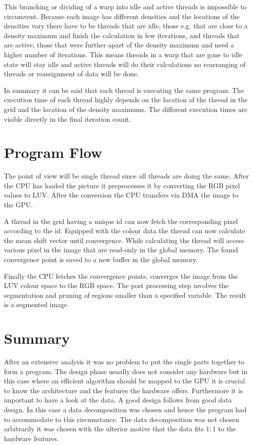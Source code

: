 This branching or dividing of a warp into idle and active threads is impossible
to circumvent. Because each image has different densities and the locations
of the densities vary there have to be threads that are idle, those e.g. that
are close to a density maximum and finish the calculation in few iterations,
and threads that are active, those that were further apart of the density maximum
and need a higher number of iterations. This means threads in a warp that
are gone to idle state will stay idle and active threads will do their 
calculations no rearranging of threads or reassignment of data will be done. 

In summary it can be said that each thread is executing the same program. The 
execution time of each thread highly depends on the location of the thread in
the grid and the location of the density maximums. The different execution times
are visible directly in the final iteration count. 

\section{Program Flow} %
\label{sec:program_flow}

The point of view will be single thread since all threads are doing the same. 
After the \gls{CPU} has loaded the picture it preprocesses it by converting
the \gls{RGB} pixel values to \gls{LUV}. After the conversion the \gls{CPU}
transfers via \gls{DMA} the image to the \gls{GPU}.

A thread in the grid having a unique id can now fetch the corresponding pixel
according to the id. Equipped with the colour data the thread can now calculate
the mean shift vector until convergence. While calculating the thread will 
access various pixel in the image that are read-only in the global memory. The 
found convergence point is saved to a new buffer in the global memory.

Finally the \gls{CPU} fetches the convergence points, converges the image from 
the \gls{LUV} colour space to the \gls{RGB} space. The post processing step
involves the segmentation and pruning of regions smaller than a specified 
variable. The result is a segmented image. 


\section{Summary} %
\label{sec:design_summary}
After an extensive analysis it was no problem to put the single parts together
to form a program. The design phase usually does not consider any hardware but
in this case where an efficient algorithm should be mapped to the \gls{GPU} it
is crucial to know the architecture and the features the hardware offers. 
Furthermore it is important to have a look at the data. A good design follows
from good data design. In this case a data decomposition was chosen and hence the 
program had to accommodate to this circumstance. The data decomposition was not 
chosen arbitrarily it was chosen with the ulterior motive that the data fits
$1:1$ to the hardware features. 

